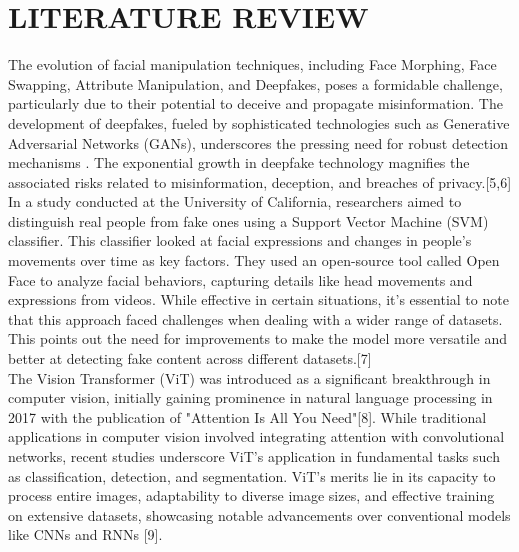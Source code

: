 \section{LITERATURE REVIEW}

The evolution of facial manipulation techniques, including Face Morphing, Face Swapping, Attribute Manipulation, and Deepfakes, poses a formidable challenge, particularly due to their potential to deceive and propagate misinformation. The development of deepfakes, fueled by sophisticated technologies such as Generative Adversarial Networks (GANs), underscores the pressing need for robust detection mechanisms . The exponential growth in deepfake technology magnifies the associated risks related to misinformation, deception, and breaches of privacy.[5,6]\\

In a study conducted at the University of California, researchers aimed to distinguish real people from fake ones using a Support Vector Machine (SVM) classifier. This classifier looked at facial expressions and changes in people's movements over time as key factors. They used an open-source tool called Open Face to analyze facial behaviors, capturing details like head movements and expressions from videos. While effective in certain situations, it's essential to note that this approach faced challenges when dealing with a wider range of datasets. This points out the need for improvements to make the model more versatile and better at detecting fake content across different datasets.[7]\\

The Vision Transformer (ViT) was introduced as a significant breakthrough in computer vision, initially gaining prominence in natural language processing in 2017 with the publication of "Attention Is All You Need"[8]. While traditional applications in computer vision involved integrating attention with convolutional networks, recent studies underscore ViT's application in fundamental tasks such as classification, detection, and segmentation. ViT's merits lie in its capacity to process entire images, adaptability to diverse image sizes, and effective training on extensive datasets, showcasing notable advancements over conventional models like CNNs and RNNs [9].\\

